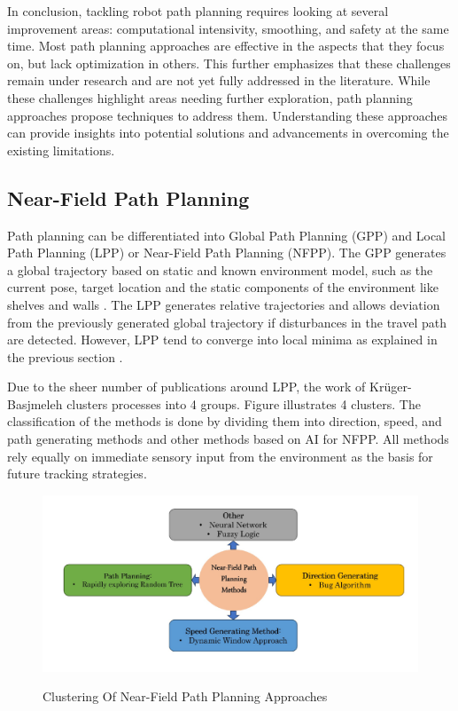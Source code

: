 In conclusion, tackling robot path planning requires looking at several improvement
areas: computational intensivity, smoothing, and safety at the same time. Most path planning approaches 
are effective in the aspects that they focus on, but lack optimization in others. This further emphasizes that these 
challenges remain under research and are not yet fully addressed in the literature. While these challenges 
highlight areas needing further exploration, path planning approaches propose techniques 
to address them. Understanding these approaches can provide insights into potential solutions and 
advancements in overcoming the existing limitations.


\subsection{Near-Field Path Planning}
Path planning can be differentiated into Global Path Planning (GPP) and Local
Path Planning (LPP) or Near-Field Path Planning (NFPP). The GPP generates a global trajectory based on static and 
known environment model, such as the current pose, target location and the static components 
of the environment like shelves and walls \cite{R28}. 
The LPP generates relative trajectories and allows deviation from the previously generated global 
trajectory if disturbances in the travel path are detected. However, LPP tend to converge into local 
minima as explained in the previous section .

Due to the sheer number of publications around LPP, the work of  Kr\"uger-Basjmeleh \cite{R28} clusters 
processes into 4 groups. Figure  illustrates 4 clusters. 
The classification of the methods is done by dividing them into direction, speed, and path generating methods and 
other methods based on AI for NFPP. All methods rely equally on immediate sensory input from the 
environment as the basis for future tracking strategies.

\begin{figure}[H]
    \begin{center}
        \includegraphics[width=6in]{images/Chap1/PP_Approaches.jpg}\\
        \caption{Clustering Of Near-Field Path Planning Approaches \cite{R28}}
        \label{cluster}
        \end{center}
\end{figure}

